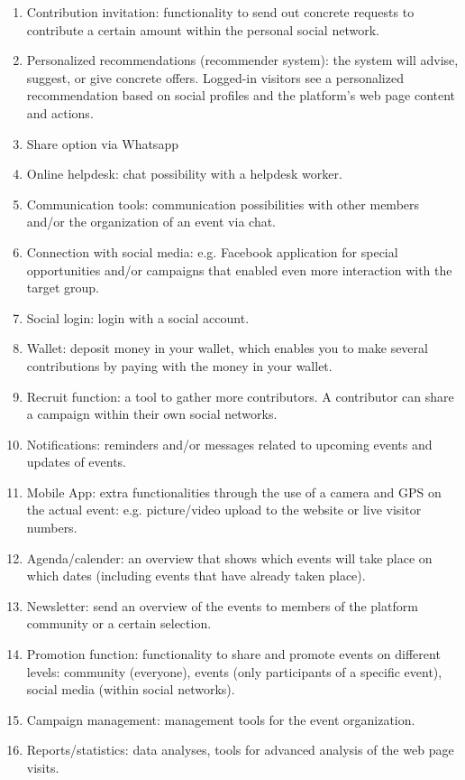 \begin{enumerate}
      \item
          Contribution invitation: functionality to send out concrete requests to contribute a certain amount
          within the personal social network.
    \item
          Personalized recommendations (recommender system): the system will advise, suggest, or give concrete offers. Logged-in visitors see a personalized recommendation based on social profiles and the
          platform’s web page content and actions.
    \item
          Share option via Whatsapp
    \item
          Online helpdesk: chat possibility with a helpdesk worker.
    \item
          Communication tools: communication possibilities with other members and/or the organization of an
          event via chat.
    \item
          Connection with social media: e.g. Facebook application for special opportunities and/or campaigns
          that enabled even more interaction with the target group.
    \item
          Social login: login with a social account.
    \item
          Wallet: deposit money in your wallet, which enables you to make several contributions by
          paying with the money in your wallet.
    \item
          Recruit function: a tool to gather more contributors. A contributor can share a campaign within their
          own social networks.
    \item
          Notifications: reminders and/or messages related to upcoming events and updates of events.
    \item
          Mobile App: extra functionalities through the use of a camera and GPS on the actual event: e.g. picture/video upload to the website or live visitor numbers.

    \item
          Agenda/calender: an overview that shows which events will take place on which dates (including events
          that have already taken place).
    \item
          Newsletter: send an overview of the events to members of the platform community or a certain
          selection.
    \item
          Promotion function: functionality to share and promote events on different levels: community (everyone), events (only participants of a specific event), social media (within social networks).
    \item
          Campaign management: management tools for the event organization.
    \item
          Reports/statistics: data analyses, tools for advanced analysis of the web page visits.
\end{enumerate}




